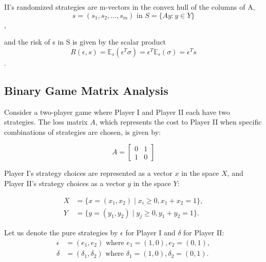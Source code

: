 \documentclass[11pt]{article}
\theoremstyle{boldStyle}
\begin{document}
II's randomized strategies are m-vectors in the convex hull of the columns of A, 
\begin{equation} \label{eq:7}
    s = (s_1, s_2, \ldots, s_m) \text{ in } S = \{Ay : y \in Y \}
\end{equation},

and the risk of s in S is given by the scalar product
\begin{equation} \label{eq:8}
    R(\epsilon, s) = \mathbb{E}_s(\epsilon^T \sigma) = \epsilon^T \mathbb{E}_s(\sigma) = \epsilon^T s
\end{equation}.



\subsection{Binary Game Matrix Analysis}

Consider a two-player game where Player I and Player II each have two strategies. The loss matrix \( A \), which represents the cost to Player II when specific combinations of strategies are chosen, is given by:

\begin{equation*}
    A = \begin{bmatrix}
    0 & 1 \\
    1 & 0
    \end{bmatrix}
\end{equation*}

Player I's strategy choices are represented as a vector \( x \) in the space \( X \), and Player II's strategy choices as a vector \( y \) in the space \( Y \):

\begin{equation*} \label{eq:strategies}
    \begin{aligned}
        X &= \{x = (x_1, x_2) \mid x_i \geq 0, x_1 + x_2 = 1\}, \\
        Y &= \{y = (y_1, y_2) \mid y_j \geq 0, y_1 + y_2 = 1\}.
    \end{aligned}
\end{equation*}

Let us denote the pure strategies by \( \epsilon \) for Player I and \( \delta \) for Player II:
\begin{equation*} \label{eq:pure_strategies}
    \begin{aligned}
        \epsilon &= (e_1, e_2) \text{ where } e_1 = (1, 0), e_2 = (0, 1), \\
        \delta &= (\delta_1, \delta_2) \text{ where } \delta_1 = (1, 0), \delta_2 = (0, 1).
    \end{aligned}
\end{equation*}
\end{document}
